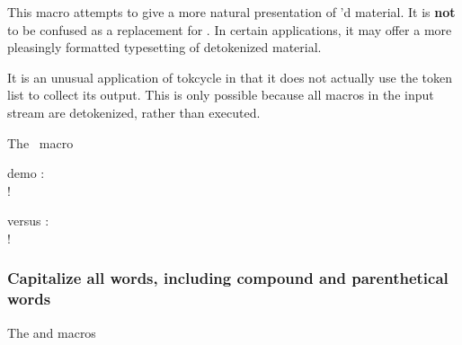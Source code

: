 \documentclass[10pt]{article}
\newcommand\TokCycle{\textsf{tokcycle}}
\begin{document}
\begingroup
This macro attempts to give a more natural presentation of 
  'd material.
It is \textbf{not} to be confused as a replacement for
  .
In certain applications, it may offer a more pleasingly formatted
  typesetting of detokenized material.

\medskip It is an unusual application of \TokCycle{} in that it does not
  actually use the  token list to collect
  its output.
This is only possible because all macros in the input stream
  are detokenized, rather than executed.

\medskip

\begin{exampleC}[]{The \ macro}
\newif\ifmacro
\newcommand\altdetokenize[1]{\begingroup\stripgroupingtrue\macrofalse
  \stripimplicitgroupingcase{-1}%
  \tokcycle
    {\ifmacro\def\tmp{##1}\ifcat\tmp A\else\unskip\allowbreak\fi\macrofalse\fi
     \detokenize{##1}\ifx##1\bgroup\unskip\fi\ifx##1\egroup\unskip\fi}
    {\ifmacro\unskip\macrofalse\fi\{\processtoks{##1}\ifmacro\unskip\fi\}\allowbreak}
    {\tctestifx{\\##1}{\\}{\ifmacro\unskip\allowbreak\fi
     \allowbreak\detokenize{##1}\macrotrue}}
    { \hspace{0pt plus 3em minus .3ex}}
    {#1}%
  \unskip
\endgroup}
\end{exampleC}

\let\mac\relax
\begin{exampleA}[lefthand width=6.3cm]
  { demo}
\string\altdetokenize: \\
\texttt{\altdetokenize{a\mac a \mac2 {\mac}\mac{a\mac\mac}\mac}}!

versus \string\detokenize: \\ 
   \texttt{\detokenize{a\mac a \mac2 {\mac}\mac{a\mac\mac}\mac}}!
\end{exampleA}
\endgroup


\subsubsection{Capitalize all words, including compound and 
  parenthetical words\label{s:cap}}

\begingroup

\begin{exampleC}[]{The  and \texttt{\string\nextcap} macros}
\newcommand\TitleCase[1]{%
  \def\capnext{T}%
  \tokcycle
    {\nextcap{##1}}
    {\def\capnext{T}\processtoks{##1}}%
    {\addcytoks{##1}}
    {\addcytoks{##1}\def\capnext{T}}%
    {#1}%
  \the\cytoks
}
\newcommand\nextcap[1]{%
       \edef\tmp{#1}%
       \tctestifx{-#1}{\def\capnext{T}}{}%
       \tctestifcon{\if T\capnext}%
         {\tctestifcon{\ifcat\tmp A}%
           {\addcytoks{\uppercase{#1}}\def\capnext{F}}%
           {\addcytoks{#1}}}%
         {\addcytoks{#1}}%
}
\end{exampleC}
\end{document}
